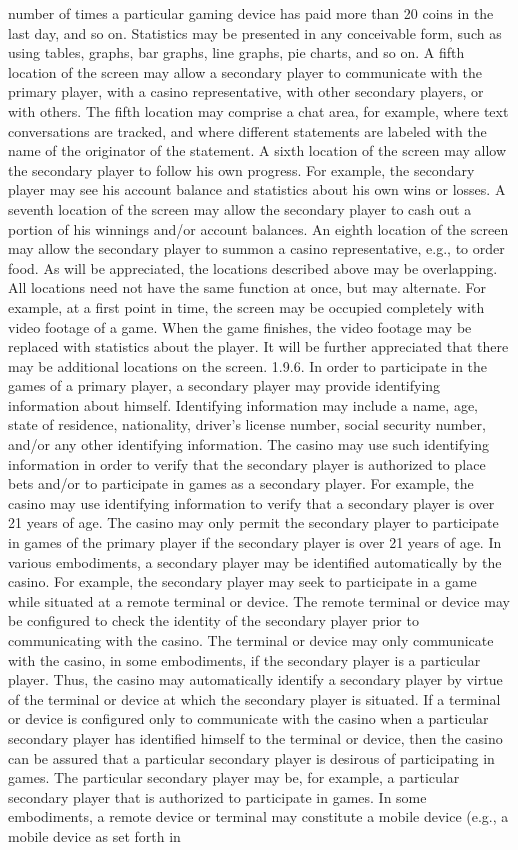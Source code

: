 \documentclass[11pt,a4paper]{article}
\begin{document}
number of times a particular gaming device has paid more than 20 coins in the last day, and so on. Statistics may be presented in any conceivable form, such as using tables, graphs, bar graphs, line graphs, pie charts, and so on. A fifth location of the screen may allow a secondary player to communicate with the primary player, with a casino representative, with other secondary players, or with others. The fifth location may comprise a chat area, for example, where text conversations are tracked, and where different statements are labeled with the name of the originator of the statement. A sixth location of the screen may allow the secondary player to follow his own progress. For example, the secondary player may see his account balance and statistics about his own wins or losses. A seventh location of the screen may allow the secondary player to cash out a portion of his winnings and/or account balances. An eighth location of the screen may allow the secondary player to summon a casino representative, e.g., to order food. As will be appreciated, the locations described above may be overlapping. All locations need not have the same function at once, but may alternate. For example, at a first point in time, the screen may be occupied completely with video footage of a game. When the game finishes, the video footage may be replaced with statistics about the player. It will be further appreciated that there may be additional locations on the screen. 1.9.6. In order to participate in the games of a primary player, a secondary player may provide identifying information about himself. Identifying information may include a name, age, state of residence, nationality, driver's license number, social security number, and/or any other identifying information. The casino may use such identifying information in order to verify that the secondary player is authorized to place bets and/or to participate in games as a secondary player. For example, the casino may use identifying information to verify that a secondary player is over 21 years of age. The casino may only permit the secondary player to participate in games of the primary player if the secondary player is over 21 years of age. In various embodiments, a secondary player may be identified automatically by the casino. For example, the secondary player may seek to participate in a game while situated at a remote terminal or device. The remote terminal or device may be configured to check the identity of the secondary player prior to communicating with the casino. The terminal or device may only communicate with the casino, in some embodiments, if the secondary player is a particular player. Thus, the casino may automatically identify a secondary player by virtue of the terminal or device at which the secondary player is situated. If a terminal or device is configured only to communicate with the casino when a particular secondary player has identified himself to the terminal or device, then the casino can be assured that a particular secondary player is desirous of participating in games. The particular secondary player may be, for example, a particular secondary player that is authorized to participate in games. In some embodiments, a remote device or terminal may constitute a mobile device (e.g., a mobile device as set forth in 
\end{document}
